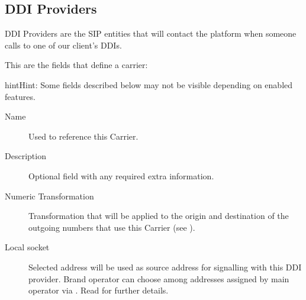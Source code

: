 \documentclass[letterpaper,10pt,english]{sphinxmanual}
\begin{document}
\subsection{DDI Providers}
\label{administration_portal/brand/providers/ddi_providers:ddi-providers}\label{administration_portal/brand/providers/ddi_providers::doc}
DDI Providers are the SIP entities that will contact the platform when someone calls to one of our client's DDIs.

This are the fields that define a carrier:

\begin{notice}{hint}{Hint:}
Some fields described below may not be visible depending on enabled features.
\end{notice}
\begin{description}
\item[{Name}] \leavevmode{}\label{administration_portal/brand/providers/ddi_providers:term-name}
Used to reference this Carrier.

\item[{Description}] \leavevmode{}\label{administration_portal/brand/providers/ddi_providers:term-description}
Optional field with any required extra information.

\item[{Numeric Transformation}] \leavevmode{}\label{administration_portal/brand/providers/ddi_providers:term-numeric-transformation}
Transformation that will be applied to the origin and destination of the
outgoing numbers that use this Carrier
(see {\hyperref[administration_portal/brand/settings/numeric_transformations:numeric\string-transformations]{}}).

\item[{Local socket}] \leavevmode{}\label{administration_portal/brand/providers/ddi_providers:term-local-socket}
Selected address will be used as source address for signalling with this DDI provider. Brand operator can choose among
addresses assigned by main operator via {\hyperref[administration_portal/platform/brands:brands]{}}. Read {\hyperref[administration_portal/platform/infrastructure/proxy_trunks:proxy\string-trunks]{}} for further details.

\end{description}
\end{document}

